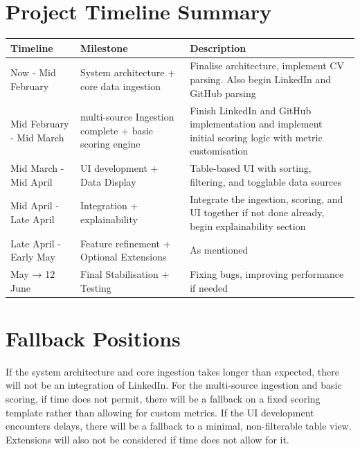 \section{Project Timeline Summary}

\begin{tabularx}{\textwidth}{|l|X|X|}
  \hline
  \textbf{Timeline} & \textbf{Milestone} & \textbf{Description} \\
  \hline
  Now - Mid February & System architecture + core data ingestion & Finalise architecture, implement CV parsing. Also begin LinkedIn and GitHub parsing \\
  \hline
  Mid February - Mid March & multi-source Ingestion complete + basic scoring engine & Finish LinkedIn and GitHub implementation and implement initial scoring logic with metric customisation \\
  \hline
  Mid March - Mid April & UI development + Data Display & Table-based UI with sorting, filtering, and togglable data sources \\
  \hline
  Mid April - Late April & Integration + explainability & Integrate the ingestion, scoring, and UI together if not done already, begin explainability section \\
  \hline
  Late April - Early May & Feature refinement + Optional Extensions & As mentioned \\
  \hline
  May → 12 June & Final Stabilisation + Testing & Fixing bugs, improving performance if needed \\
  \hline
\end{tabularx}

\section{Fallback Positions}

If the system architecture and core ingestion takes longer than expected, there will not be an integration of LinkedIn.
For the multi-source ingestion and basic scoring, if time does not permit, there will be a fallback on a fixed scoring template rather than allowing for custom metrics.
If the UI development encounters delays, there will be a fallback to a minimal, non-filterable table view.
Extensions will also not be considered if time does not allow for it.
